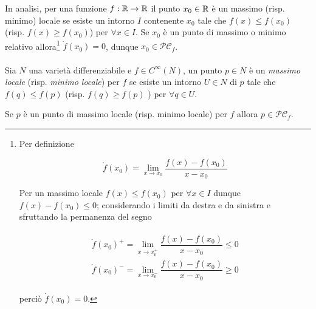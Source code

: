 In analisi, per una funzione $ f : \mathbb{R} \to \mathbb{R} $ il punto $ x_{0} \in \mathbb{R} $ è un massimo (risp. minimo) locale se esiste un intorno $ I $ contenente $ x_{0} $ tale che $ f(x) \leqslant f(x_{0}) $ (risp. $ f(x) \geqslant f(x_{0}) $) per $ \forall x \in I $. Se $ x_{0} $ è un punto di massimo o minimo relativo allora\footnote{%
	Per definizione
	
	\begin{equation*}
		\dot{f}(x_{0}) = \lim_{x \to x_{0}} \dfrac{f(x) - f(x_{0})}{x - x_{0}}
	\end{equation*}

	Per un massimo locale $ f(x) \leqslant f(x_{0}) $ per $ \forall x \in I $ dunque $ f(x) - f(x_{0}) \leqslant 0 $; considerando i limiti da destra e da sinistra e sfruttando la permanenza del segno
	
	\begin{align*}
		\begin{split}
			\dot{f}(x_{0})^{+} = \lim_{x \to x_{0}^{+}} \dfrac{f(x) - f(x_{0})}{x - x_{0}} \leqslant 0\\
			\dot{f}(x_{0})^{-} = \lim_{x \to x_{0}^{-}} \dfrac{f(x) - f(x_{0})}{x - x_{0}} \geqslant 0
		\end{split}
	\end{align*}

	perciò $ \dot{f}(x_{0}) = 0 $.%
} $ \dot{f}(x_{0}) = 0 $, dunque $ x_{0} \in \mathcal{PC}_{f} $.\\\\
%
Sia $ N $ una varietà differenziabile e $ f \in C^{\infty}(N) $, un punto $ p \in N $ è un \textit{massimo locale} (risp. \textit{minimo locale}) per $ f $ se esiste un intorno $ U \in N $ di $ p $ tale che $ f(q) \leqslant f(p) $ (risp. $ f(q) \geqslant f(p) $ ) per $ \forall q \in U $.

\begin{definition}
	Se $ p $ è un punto di massimo locale (risp. minimo locale) per $ f $ allora $ p \in \mathcal{PC}_{f} $.
\end{definition}

